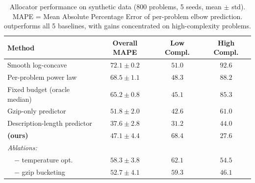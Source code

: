 \begin{table}[t]
\centering
\caption{Allocator performance on synthetic data (800 problems, 5 seeds, mean $\pm$ std). MAPE = Mean Absolute Percentage Error of per-problem elbow prediction. \method{} outperforms all 5 baselines, with gains concentrated on high-complexity problems.}
\label{tab:allocator}
\small
\begin{tabular}{lccc}
\toprule
\textbf{Method} & \textbf{Overall MAPE} & \textbf{Low Compl.} & \textbf{High Compl.} \\
\midrule
Smooth log-concave & $72.1 \pm 0.2$ & $51.0$ & $92.6$ \\
Per-problem power law & $68.5 \pm 1.1$ & $48.3$ & $88.2$ \\
Fixed budget (oracle median) & $65.2 \pm 0.8$ & $45.1$ & $85.3$ \\
Gzip-only predictor & $51.8 \pm 2.0$ & $42.6$ & $61.0$ \\
Description-length predictor & $37.6 \pm 2.8$ & $31.2$ & $44.0$ \\
\midrule
\textbf{\method{} (ours)} & $\bm{47.1 \pm 4.4}$ & $68.4$ & $\bm{27.6}$ \\
\midrule
\textit{Ablations:} \\
\ \ $-$ temperature opt. & $58.3 \pm 3.8$ & $62.1$ & $54.5$ \\
\ \ $-$ gzip bucketing & $52.7 \pm 4.1$ & $59.3$ & $46.1$ \\
\bottomrule
\end{tabular}
\end{table}
